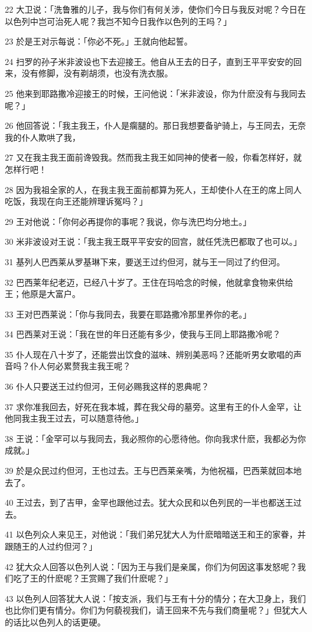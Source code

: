 \par 22 大卫说：「洗鲁雅的儿子，我与你们有何关涉，使你们今日与我反对呢？今日在以色列中岂可治死人呢？我岂不知今日我作以色列的王吗？」
\par 23 於是王对示每说：「你必不死。」王就向他起誓。
\par 24 扫罗的孙子米非波设也下去迎接王。他自从王去的日子，直到王平平安安的回来，没有修脚，没有剃胡须，也没有洗衣服。
\par 25 他来到耶路撒冷迎接王的时候，王问他说：「米非波设，你为什麽没有与我同去呢？」
\par 26 他回答说：「我主我王，仆人是瘸腿的。那日我想要备驴骑上，与王同去，无奈我的仆人欺哄了我，
\par 27 又在我主我王面前谗毁我。然而我主我王如同神的使者一般，你看怎样好，就怎样行吧！
\par 28 因为我祖全家的人，在我主我王面前都算为死人，王却使仆人在王的席上同人吃饭，我现在向王还能辨理诉冤吗？」
\par 29 王对他说：「你何必再提你的事呢？我说，你与洗巴均分地土。」
\par 30 米非波设对王说：「我主我王既平平安安的回宫，就任凭洗巴都取了也可以。」
\par 31 基列人巴西莱从罗基琳下来，要送王过约但河，就与王一同过了约但河。
\par 32 巴西莱年纪老迈，已经八十岁了。王住在玛哈念的时候，他就拿食物来供给王；他原是大富户。
\par 33 王对巴西莱说：「你与我同去，我要在耶路撒冷那里养你的老。」
\par 34 巴西莱对王说：「我在世的年日还能有多少，使我与王同上耶路撒冷呢？
\par 35 仆人现在八十岁了，还能尝出饮食的滋味、辨别美恶吗？还能听男女歌唱的声音吗？仆人何必累赘我主我王呢？
\par 36 仆人只要送王过约但河，王何必赐我这样的恩典呢？
\par 37 求你准我回去，好死在我本城，葬在我父母的墓旁。这里有王的仆人金罕，让他同我主我王过去，可以随意待他。」
\par 38 王说：「金罕可以与我同去，我必照你的心愿待他。你向我求什麽，我都必为你成就。」
\par 39 於是众民过约但河，王也过去。王与巴西莱亲嘴，为他祝福，巴西莱就回本地去了。
\par 40 王过去，到了吉甲，金罕也跟他过去。犹大众民和以色列民的一半也都送王过去。
\par 41 以色列众人来见王，对他说：「我们弟兄犹大人为什麽暗暗送王和王的家眷，并跟随王的人过约但河？」
\par 42 犹大众人回答以色列人说：「因为王与我们是亲属，你们为何因这事发怒呢？我们吃了王的什麽呢？王赏赐了我们什麽呢？」
\par 43 以色列人回答犹大人说：「按支派，我们与王有十分的情分；在大卫身上，我们也比你们更有情分。你们为何藐视我们，请王回来不先与我们商量呢？」但犹大人的话比以色列人的话更硬。

